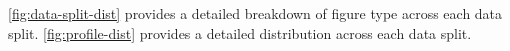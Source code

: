 \autoref{fig:data-split-dist} provides a detailed breakdown of figure type across each data split.
\autoref{fig:profile-dist} provides a detailed distribution across each data split.


